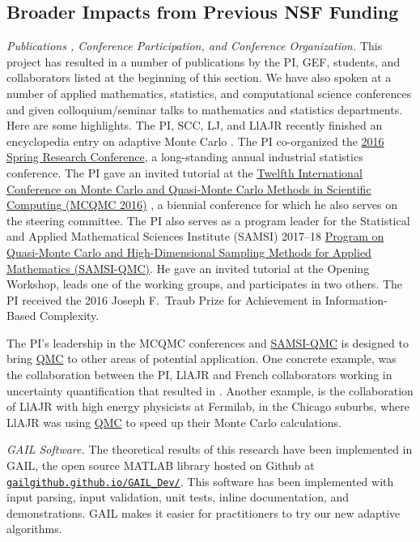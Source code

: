 \documentclass[11pt]{NSFamsart}
\newcommand{\QMC}{\hyperlink{QMClink}{QMC}\xspace}
\newcommand{\SAMSIQMC}{\hyperlink{SAMSIlink}{SAMSI-QMC}\xspace}
\begin{document}
\subsection{Broader Impacts from Previous NSF Funding} \label{prevBIsect}

\emph{Publications , Conference Participation, and Conference Organization.} This 
project has resulted in a number of publications by the PI, GEF, students, and collaborators listed at 
the beginning of this section.  We have also spoken at a number of applied mathematics, statistics, 
and computational science conferences and given colloquium/seminar talks to mathematics and 
statistics departments.  Here are some highlights.  The PI, SCC, LJ, and LlAJR recently finished an 
encyclopedia entry on adaptive Monte Carlo \cite{HicEtal18a}.  The PI co-organized the 
\href{http://cos.iit.edu/2016-spring-research-conference/}{2016 Spring Research 
Conference}, a long-standing annual industrial statistics conference.   The PI gave an invited tutorial 
at the \href{http://mcqmc2016.stanford.edu}{Twelfth International 
Conference on Monte Carlo and Quasi-Monte Carlo Methods in Scientific Computing (MCQMC 
2016)} 
\cite{Hic17a}, a biennial conference for which he also serves on the steering committee.  The PI also 
serves as a program leader for the Statistical and Applied Mathematical Sciences 
Institute (SAMSI) 2017--18 
\href{https://www.samsi.info/programs-and-activities/year-long-research-programs/2017-18-program-quasi-monte-carlo-high-dimensional-sampling-methods-applied-mathematics-qmc/
}{Program on Quasi-Monte Carlo and High-Dimensional Sampling Methods for Applied 
	Mathematics (\hypertarget{SAMSIlink}{SAMSI-QMC})}.   He  gave an invited tutorial 
	at the Opening Workshop, leads one of 
	the working groups, and participates in two others.  The PI received the 2016 Joseph F.\ Traub 
	Prize for Achievement in Information-Based Complexity.
	
	
The PI's leadership in the MCQMC conferences  and \SAMSIQMC is 
	designed to bring \QMC to other areas of potential application.  One concrete example, was the 
	collaboration between the PI, LlAJR and French collaborators working in uncertainty quantification 
	that resulted in \cite{GilEtal16a, GilJim16b}.  Another example, is the collaboration of LlAJR with 
	high energy physicists at Fermilab, in the Chicago suburbs, where LlAJR was using \QMC to speed 
	up their Monte Carlo calculations.
	
\emph{GAIL Software.} The theoretical results of this research have been implemented in 
GAIL, the open source MATLAB library hosted on Github at 
\href{http://gailgithub.github.io/GAIL_Dev/} {\nolinkurl{gailgithub.github.io/GAIL_Dev/}}. This software 
has been implemented with input parsing, input validation, unit tests, inline documentation, and 
demonstrations.  GAIL makes it easier for practitioners to try our new adaptive algorithms.  
\end{document}
